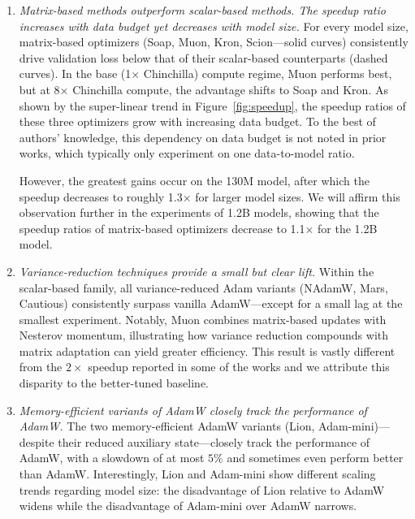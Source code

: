 \begin{enumerate}[leftmargin=*]
\item \textit{Matrix-based methods outperform scalar-based methods. The speedup ratio increases with data budget yet decreases with model size.}
For every model size, matrix-based optimizers (Soap, Muon, Kron, Scion—solid curves) consistently drive validation loss below that of their scalar-based counterparts (dashed curves). In the base (1$\times$ Chinchilla) compute regime, Muon performs best, but at 8× Chinchilla compute, the advantage shifts to Soap and Kron. As shown by the super-linear trend in Figure~\ref{fig:speedup}, the speedup ratios of these three optimizers grow with increasing data budget. To the best of authors' knowledge, this dependency on data budget is not noted in prior works, which typically only experiment on one data-to-model ratio.

However, the greatest gains occur on the 130M model, after which the speedup decreases to roughly 1.3× for larger model sizes. We will affirm this observation further in the experiments of 1.2B models, showing that the speedup ratios of matrix-based optimizers decrease to 1.1$\times$ for the 1.2B model.

\item \textit{Variance-reduction techniques provide a small but clear lift.}
Within the scalar-based family, all variance-reduced Adam variants ({NAdamW}, {Mars}, {Cautious}) consistently surpass vanilla AdamW---except for a small lag at the smallest experiment. Notably, {Muon} combines matrix-based updates with Nesterov momentum, illustrating how variance reduction compounds with matrix adaptation can yield greater efficiency. This result is vastly different from the $2\times$ speedup reported in some of the works and we attribute this disparity to the better-tuned baseline.


\item \textit{Memory-efficient variants of AdamW closely track the performance of AdamW.} 
The two memory-efficient AdamW variants ({Lion}, {Adam-mini})—despite their reduced auxiliary state—closely track the performance of AdamW, with a slowdown of at most $5\%$ and sometimes even perform better than AdamW. Interestingly, Lion and Adam-mini show different scaling trends regarding model size: the disadvantage of Lion relative to AdamW widens while the disadvantage of Adam-mini over AdamW narrows. 
\end{enumerate}











